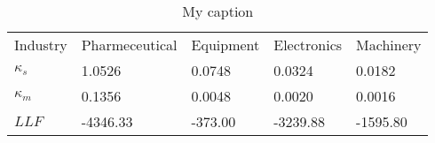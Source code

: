 \begin{table}[]
\centering
\caption{My caption}
\label{my-label}
\begin{tabular}{lllll}
Industry & Pharmeceutical & Equipment & Electronics & Machinery \\
$\kappa _s$   & 1.0526         & 0.0748    & 0.0324      & 0.0182    \\
$\kappa_m$   & 0.1356         & 0.0048    & 0.0020      & 0.0016    \\
$LLF$      & -4346.33       & -373.00   & -3239.88    & -1595.80 
\end{tabular}
\end{table}